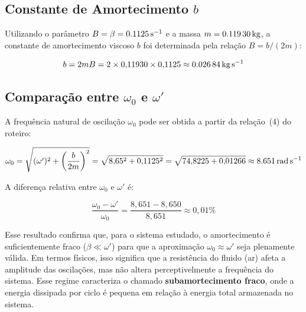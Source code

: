 \documentclass[12pt,a4paper]{article}
\begin{document}
\subsection{Constante de Amortecimento $b$}

Utilizando o parâmetro $B = \beta = \SI{0{,}1125}{\per\second}$ e a massa $m = \SI{0{,}11930}{\kilo\gram}$, a constante de amortecimento viscoso $b$ foi determinada pela relação $B = b/(2m)$:

\begin{equation}
    b = 2mB = 2 \times 0{,}11930 \times 0{,}1125 \approx \SI{0{,}02684}{\kilo\gram\per\second}
\end{equation}

\subsection{Comparação entre $\omega_0$ e $\omega'$}

A frequência natural de oscilação $\omega_0$ pode ser obtida a partir da relação~(4) do roteiro:

\begin{equation}
    \omega_0 = \sqrt{(\omega')^2 + \left(\frac{b}{2m}\right)^2} = \sqrt{8{,}65^2 + 0{,}1125^2} = \sqrt{74{,}8225 + 0{,}01266} \approx \SI{8{,}651}{\radian\per\second}
\end{equation}

A diferença relativa entre $\omega_0$ e $\omega'$ é:

\begin{equation}
    \frac{\omega_0 - \omega'}{\omega_0} = \frac{8{,}651 - 8{,}650}{8{,}651} \approx 0{,}01\%
\end{equation}

Esse resultado confirma que, para o sistema estudado, o amortecimento é suficientemente fraco ($\beta \ll \omega'$) para que a aproximação $\omega_0 \approx \omega'$ seja plenamente válida. Em termos físicos, isso significa que a resistência do fluido (ar) afeta a amplitude das oscilações, mas não altera perceptivelmente a frequência do sistema. Esse regime caracteriza o chamado \textbf{subamortecimento fraco}, onde a energia dissipada por ciclo é pequena em relação à energia total armazenada no sistema.




\end{document}
